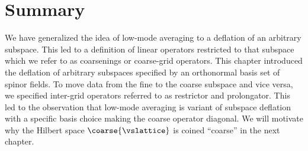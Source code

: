 \section{Summary}
\label{sec:sd:summary}

We have generalized the idea of low-mode averaging to a deflation of an arbitrary subspace.
This led to a definition of linear operators restricted to that subspace which we refer to as coarsenings or coarse-grid operators.
This chapter introduced the deflation of arbitrary subspaces specified by an orthonormal basis set of spinor fields.
To move data from the fine to the coarse subspace and vice versa, we specified inter-grid operators referred to as restrictor and prolongator.
This led to the observation that low-mode averaging is variant of subspace deflation with a specific basis choice making the coarse operator diagonal.
We will motivate why the Hilbert space $\coarse{\vslattice}$ is coined ``coarse'' in the next chapter.
